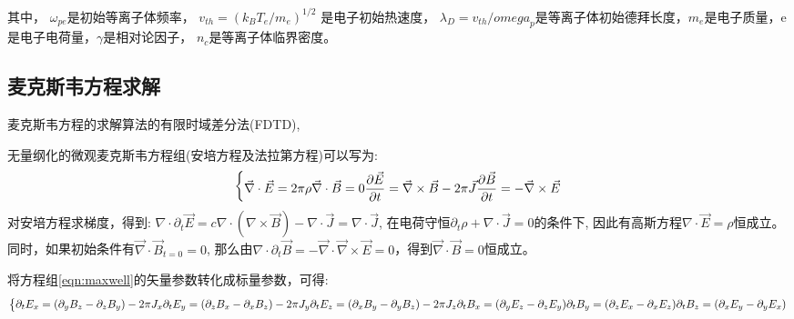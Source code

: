   
其中， $\omega_{pe}$是初始等离子体频率， $v_{th}=(k_B T_e / m_e)^{1/2}$ 是电子初始热速度， $\lambda_D=v_{th}/ {omega}_p$是等离子体初始德拜长度，$m_e$是电子质量，e是电子电荷量，$\gamma$是相对论因子， $n_c$是等离子体临界密度。
  


 \subsection{麦克斯韦方程求解} 
麦克斯韦方程的求解算法的有限时域差分法(FDTD),

无量纲化的微观麦克斯韦方程组(安培方程及法拉第方程)可以写为:  
\begin{equation}
\label{eqn:maxwell}
\begin{dcases*}
\vec{\nabla} \cdot \vec{E}= 2 \pi \rho
\vec{\nabla} \cdot \vec{B}= 0

\frac{\partial{\vec{E}}}{\partial{t}} = \vec{\nabla} \times \vec{B} - 2 \pi \vec{J}
\frac{\partial{\vec{B}}}{\partial{t}} = -\vec{\nabla} \times \vec{E}
\end{dcases*}
\end{equation}  
对安培方程求梯度，得到:  
${\nabla} \cdot {\partial}_t \vec{E} = c {\nabla} \cdot ({\nabla} \times \vec{B})-{\nabla} \cdot \vec{J}={\nabla} \cdot \vec{J} $, 在电荷守恒${\partial}_t  \rho + {\nabla} \cdot \vec{J} =0 $的条件下, 因此有高斯方程${\nabla} \cdot \vec{E}=\rho $恒成立。同时，如果初始条件有$\vec{\nabla} \cdot \vec{B}_{t=0}=0$, 那么由$\nabla \cdot {\partial}_t \vec{B} = -\vec{\nabla} \cdot \vec{\nabla} \times \vec{E} =0$，得到$\vec{\nabla} \cdot \vec{B}=0$恒成立。

将方程组\ref{eqn:maxwell}的矢量参数转化成标量参数，可得:
\begin{equation}
\label{eqn:maxwell_scale}
\begin{dcases*}

\partial_t {E_x}=(\partial_y {B_z} - \partial_z {B_y}) - 2 \pi J_x
\partial_t {E_y}=(\partial_z {B_x} - \partial_x {B_z}) - 2 \pi J_y
\partial_t {E_z}=(\partial_x {B_y} - \partial_y {B_z}) - 2 \pi J_z
\partial_t {B_x}=(\partial_y {E_z} - \partial_z {E_y})
\partial_t {B_y}=(\partial_z {E_x} - \partial_x {E_z})
\partial_t {B_z}=(\partial_x {E_y} - \partial_y {E_x})

\end{dcases*}
\end{equation} 
  


